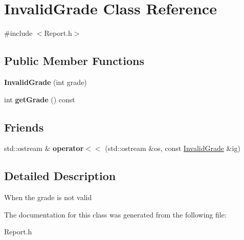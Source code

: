 \hypertarget{class_invalid_grade}{}\section{Invalid\+Grade Class Reference}
\label{class_invalid_grade}


{\ttfamily \#include $<$Report.\+h$>$}

\subsection*{Public Member Functions}
\begin{DoxyCompactItemize}
\item 
\mbox{\label{class_invalid_grade_a45b993c52fbd0083f8344a4e437b0fd8}} 
{\bfseries Invalid\+Grade} (int grade)
\item 
\mbox{\label{class_invalid_grade_a804b310f3aa6d5b388ff36dac76b06da}} 
int {\bfseries get\+Grade} () const
\end{DoxyCompactItemize}
\subsection*{Friends}
\begin{DoxyCompactItemize}
\item 
\mbox{\label{class_invalid_grade_abd6d4b28be315c2b68592594412c7632}} 
std\+::ostream \& {\bfseries operator$<$$<$} (std\+::ostream \&os, const \mbox{\hyperlink{class_invalid_grade}{Invalid\+Grade}} \&ig)
\end{DoxyCompactItemize}


\subsection{Detailed Description}
When the grade is not valid 

The documentation for this class was generated from the following file\+:\begin{DoxyCompactItemize}
\item 
Report.\+h\end{DoxyCompactItemize}
